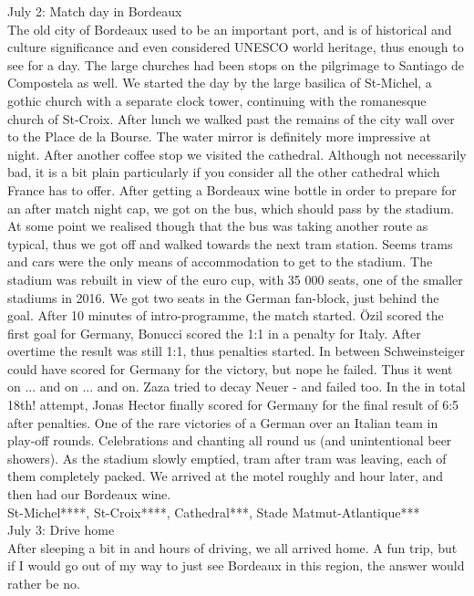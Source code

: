July 2: Match day in Bordeaux\\
The old city of Bordeaux used to be an important port, and is of historical and culture significance and even considered UNESCO world heritage, thus enough to see for a day. The large churches had been stops on the pilgrimage to Santiago de Compostela as well. We started the day by the large basilica of St-Michel, a gothic church with a separate clock tower, continuing with the romanesque church of St-Croix. After lunch we walked past the remains of the city wall over to the Place de la Bourse. The water mirror is definitely more impressive at night. After another coffee stop we visited the cathedral. Although not necessarily bad, it is a bit plain particularly if you consider all the other cathedral which France has to offer. After getting a Bordeaux wine bottle in order to prepare for an after match night cap, we got on the bus, which should pass by the stadium. At some point we realised though that the bus was taking another route as typical, thus we got off and walked towards the next tram station. Seems trams and cars were the only means of accommodation to get to the stadium. The stadium was rebuilt in view of the euro cup, with 35 000 seats, one of the smaller stadiums in 2016. We got two seats in the German fan-block, just behind the goal. After 10 minutes of intro-programme, the match started. \"Ozil scored the first goal for Germany, Bonucci scored the 1:1 in a penalty for Italy. After overtime the result was still 1:1, thus penalties started. In between Schweinsteiger could have scored for Germany for the victory, but nope he failed. Thus it went on ... and on ... and on. Zaza tried to decay Neuer - and failed too. In the in total 18th! attempt, Jonas Hector finally scored for Germany for the final result of 6:5 after penalties. One of the rare victories of a German over an Italian team in play-off rounds. Celebrations and chanting all round us (and unintentional beer showers). As the stadium slowly emptied, tram after tram was leaving, each of them completely packed. We arrived at the motel roughly and hour later, and then had our Bordeaux wine.\\

St-Michel****, St-Croix****, Cathedral***, Stade Matmut-Atlantique***\\

July 3: Drive home\\
After sleeping a bit in and hours of driving, we all arrived home. A fun trip, but if I would go out of my way to just see Bordeaux in this region, the answer would rather be no.

